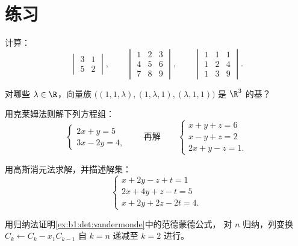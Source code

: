 \section{练习}

\begin{exercise}[$\star$]\label{exo:b1:det:1}
计算：
\[
\begin{vmatrix} 3 & 1\\ 5 & 2 \end{vmatrix},
\qquad
\begin{vmatrix} 1 & 2 & 3\\ 4 & 5 & 6\\ 7 & 8 & 9\end{vmatrix},
\qquad
\begin{vmatrix} 1 & 1 & 1\\ 1 & 2 & 4\\ 1 & 3 & 9\end{vmatrix}.
\]
\end{exercise}

\begin{exercise}[$\star$]\label{exo:b1:det:2}
对哪些 $\lambda \in \R$，向量族 $\bigl((1, 1, \lambda),
(1, \lambda, 1), (\lambda, 1, 1)\bigr)$ 是 $\R^3$ 的基？
\end{exercise}

\begin{exercise}[$\star$]\label{exo:b1:det:3}
用克莱姆法则解下列方程组：
\[
\begin{cases}
2x + y = 5\\
3x - 2y = 4 ,
\end{cases}
\qquad\text{再解}\qquad
\begin{cases}
x + y + z = 6\\
x - y + z = 2\\
2x + y - z = 1 .
\end{cases}
\]
\end{exercise}

\begin{exercise}[$\star$]\label{exo:b1:det:4}
用高斯消元法求解，并描述解集：
\[
\begin{cases}
x + 2y - z + t = 1\\
2x + 4y + z - t = 5\\
x + 2y + 2z - 2t = 4 .
\end{cases}
\]
\end{exercise}

\begin{exercise}[$\star\star$]\label{exo:b1:det:5}
用归纳法证明\cref{ex:b1:det:vandermonde}中的范德蒙德公式，
对 $n$ 归纳，列变换 $C_k \leftarrow C_k -
x_1 C_{k-1}$ 自 $k = n$ 递减至 $k = 2$ 进行。
\end{exercise}

